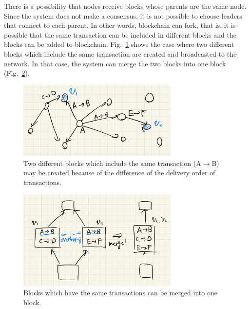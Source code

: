 \documentclass[a4j,11pt,uplatex,twocolumn]{article}
\begin{document}
There is a possibility that nodes receive blocks whose parents are the same node.
Since the system does not make a consensus, it is not possible to choose leaders that connect to each parent.
In other words, blockchain can fork, that is, it is possible that the same transaction can be included in different blocks and the blocks can be added to blockchain.
Fig.~\ref{fig:different-blocks} shows the case where two different blocks which include the same transaction are created and broadcasted to the network.
In that case, the system can merge the two blocks into one block (Fig.~\ref{fig:merge}).
\begin{figure}[tbp]
    \begin{center}
        \includegraphics[width=8.0cm]{./fig/different-blocks.jpeg}
        \caption{Two different blocks which include the same transaction (A$\rightarrow$B) may be created because of the difference of the delivery order of transactions.}
        \label{fig:different-blocks}
    \end{center}
\end{figure}

\begin{figure}[tbp]
    \begin{center}
        \includegraphics[width=8.0cm]{./fig/merge.jpeg}
        \caption{Blocks which have the same transactions can be merged into one block.}
        \label{fig:merge}
    \end{center}
\end{figure}
\end{document}
